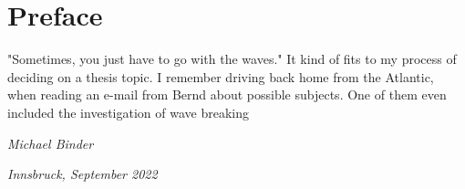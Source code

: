 \chapter*{Preface}
\thispagestyle{plain}


"Sometimes, you just have to go with the waves." It kind of fits to my process of deciding on a thesis topic. I remember driving back home from the Atlantic, when reading an e-mail from Bernd about possible subjects. One of them even included the investigation of wave breaking





\begin{flushright}
\textit{Michael Binder}

\textit{Innsbruck, September 2022} 
\end{flushright}
